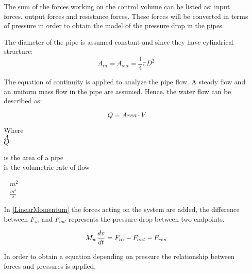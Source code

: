 The sum of the forces working on the control volume can be listed as: input forces, output forces and resistance forces.  
These forces will be converted in terms of pressure in order to obtain the model of the pressure drop in the pipes. 

The diameter of the pipe is assumed constant and since they have cylindrical structure:
\begin{equation}
  A_{in} = A_{out} = \frac{1}{4}\pi D^{2}
\end{equation}

The equation of continuity is applied to analyze the pipe flow. A steady flow and an uniform 
mass flow in the pipe are assumed. Hence, the water flow can be described as: 

\begin{equation}
  Q=Area \cdot V
	\label{EquationOfContinuity}
\end{equation}

 \begin{minipage}[t]{0.20\textwidth}
Where\\
\hspace*{8mm} $A$ \\
\hspace*{8mm} $Q$ 
\end{minipage}
\begin{minipage}[t]{0.68\textwidth}
\vspace*{2mm}
is the area of a pipe\\
is the volumetric rate of flow

\end{minipage}
\begin{minipage}[t]{0.10\textwidth}
\vspace*{2mm}
\textcolor{White}{te}$\unit{m^{2}}$\\
\textcolor{White}{te}$\unit{\frac{m^{3}}{s}}$
\end{minipage}

 In \eqref{LinearMomentum} the forces acting on the system are added, the difference between $F_{in}$ and $F_{out}$ represents the pressure drop 
 between two endpoints.

\begin{equation}
  M_w \frac{dv}{dt} = F_{in} - F_{out} - F_{res} \\
  \label{LinearMomentum}
\end{equation}

In order to obtain a equation depending on pressure the relationship between forces and pressures is applied.


